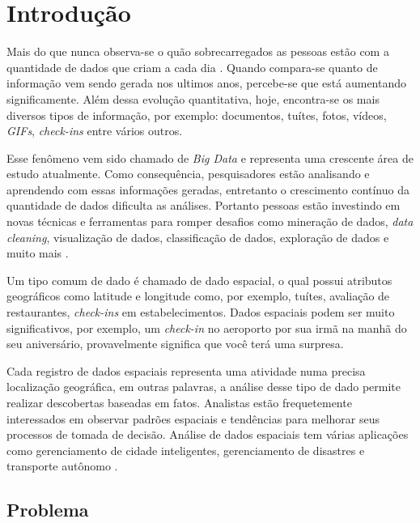 \chapter{Introdução}
\label{chap:introducao}

Mais do que nunca observa-se o quão sobrecarregados as pessoas estão com a quantidade de dados que criam a cada dia \cite{Pradeep2017}. Quando compara-se quanto de informação vem sendo gerada nos ultimos anos, percebe-se que está aumentando significamente. Além dessa evolução quantitativa, hoje, encontra-se os mais diversos tipos de informação, por exemplo: documentos, tuítes, fotos, vídeos, \textit{GIFs}, \textit{check-ins} entre vários outros.

Esse fenômeno vem sido chamado de \textit{Big Data} e representa uma crescente área de estudo atualmente. Como consequência, pesquisadores estão analisando e aprendendo com essas informações geradas, entretanto o crescimento contínuo da quantidade de dados dificulta as análises. Portanto pessoas estão investindo em novas técnicas e ferramentas para romper desafios como mineração de dados, {\em data cleaning}, visualização de dados, classificação de dados, exploração de dados e muito mais \cite{Zhang2015}.

Um tipo comum de dado é chamado de dado espacial, o qual  possui atributos geográficos como latitude e longitude como, por exemplo, tuítes, avaliação de restaurantes, {\em check-ins} em estabelecimentos. Dados espaciais podem ser muito significativos, por exemplo, um {\em check-in} no aeroporto por sua irmã na manhã do seu aniversário, provavelmente significa que você terá uma surpresa.

Cada registro de dados espaciais representa uma atividade numa precisa localização geográfica, em outras palavras, a análise desse tipo de dado permite realizar descobertas baseadas em fatos. Analistas estão frequetemente interessados em observar padrões espaciais e tendências para melhorar seus processos de tomada de decisão. Análise de dados espaciais tem várias aplicações como gerenciamento de cidade inteligentes, gerenciamento de disastres e transporte autônomo \cite{RoddickEHPS04,Telang:2012}.

\section{Problema}

